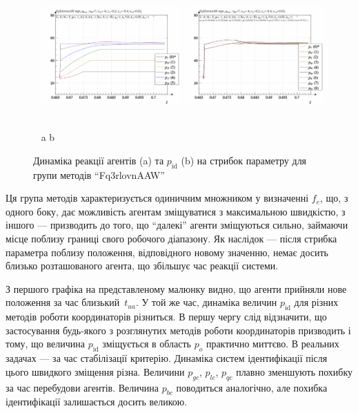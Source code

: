 \begin{figure}[htb!]
  \begin{center}
    ~ \hfill
    \includegraphics[width=0.48\textwidth]{p/sign/qls-p_t_pi_m_Fq3rlovnAAW_sign.png}
    \hfill
    \includegraphics[width=0.48\textwidth]{p/sign/qls-p_t_p_m_Fq3rlovnAAW_sign.png}
    \hfill ~
  \end{center}
  \vspace{-1.0ex}
  \begin{center}
    ~ \hfill a \hfill\hfill b  \hfill ~
  \end{center}
  \vspace{-1.5ex}
  \caption{Динаміка реакції агентів (a) та $p_\mathrm{id}$ (b) на стрибок параметру для групи методів ``Fq3rlovnAAW''}
  \label{atu:f:Fq3rlovnAAW_sign}
\end{figure}

Ця група методів характеризується одиничним множником у визначенні $f_e$, що,
з одного боку, дає можливість агентам зміщуватися з максимальною швидкістю, з
іншого --- призводить до того, що ``далекі'' агенти зміщуються сильно,
займаючи місце поблизу границі свого робочого діапазону. Як наслідок --- після
стрибка параметра поблизу положення, відповідного новому значенню, немає
досить близько розташованого агента, що збільшує час реакції системи.

З першого графіка на представленому малюнку видно, що агенти
прийняли нове положення за час близький~$t_{ua}$.
У той же час, динаміка величин
$p_\mathrm{id}$ для різних методів роботи координаторів різниться. В
першу чергу слід відзначити, що застосування будь-якого з
розглянутих методів роботи координаторів призводить і тому,
що величина
$p_\mathrm{id}$ зміщується в область
$p_o$ практично миттєво. В реальних задачах --- за час стабілізації
критерію. Динаміка систем ідентифікації після цього швидкого
зміщення різна. Величини
$p_{gc}$,
$p_{lc}$,
$p_{qc}$ плавно зменшують похибку за час перебудови
агентів. Величина
$p_{bc}$ поводиться аналогічно, але похибка ідентифікації
залишається досить великою.

